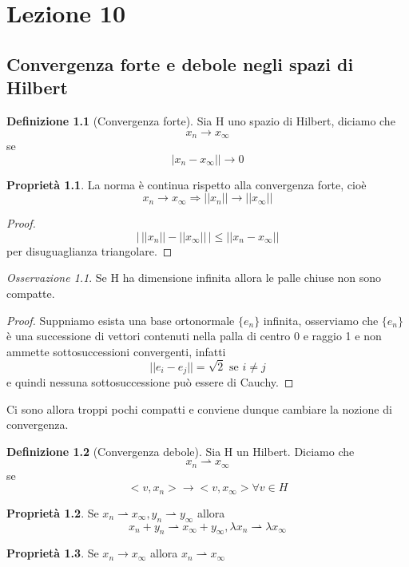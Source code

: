 \documentclass[a4paper]{book}
\theoremstyle{definition}
\newtheorem{defn}{Definizione}
\theoremstyle{remark}
\newtheorem{oss}{Osservazione}
\theoremstyle{definition}
\newtheorem{prop}{Proprietà}
\newcommand{\ra}{\Rightarrow}
\begin{document}
\chapter{Lezione 10}
\section{Convergenza forte e debole negli spazi di Hilbert}
\begin{defn}[Convergenza forte]
	Sia H uno spazio di Hilbert, diciamo che $$x_n \to x_\infty$$ se $$|x_n - x_\infty|| \to 0$$
\end{defn}

\begin{prop}
	La norma è continua rispetto alla convergenza forte, cioè $$x_n \to x_\infty \ra ||x_n||\to ||x_\infty||$$
\end{prop}

\begin{proof}
	$$ \big| \, ||x_n|| - ||x_\infty|| \, \big| \le ||x_n - x_\infty||$$ per disuguaglianza triangolare.
\end{proof}

\begin{oss}
	Se H ha dimensione infinita allora le palle chiuse non sono compatte.
\end{oss}

\begin{proof}
	Suppniamo esista una base ortonormale $\{e_n\}$ infinita, osserviamo che $\{e_n\}$ è una successione di vettori contenuti nella palla di centro 0 e raggio 1 e non ammette sottosuccessioni convergenti, infatti $$||e_i - e_j|| = \sqrt{2} \text{ se } i \not = j$$ e quindi nessuna sottosuccessione può essere di Cauchy.
\end{proof}

Ci sono allora troppi pochi compatti e conviene dunque cambiare la nozione di convergenza.

\begin{defn}[Convergenza debole]
	Sia H un Hilbert. Diciamo che
	$$x_n \rightharpoonup x_\infty$$ se $$<v,x_n> \to <v, x_\infty> \forall v \in H$$
\end{defn}

\begin{prop}
	Se $x_n \rightharpoonup x_\infty, y_n \rightharpoonup y_\infty$ allora
	$$x_n + y_n \rightharpoonup x_\infty + y_\infty, \lambda x_n \rightharpoonup \lambda x_\infty$$
\end{prop}

\begin{prop}
	Se $x_n \to x_\infty$ allora $x_n \rightharpoonup x_\infty$
\end{prop}
\end{document}
